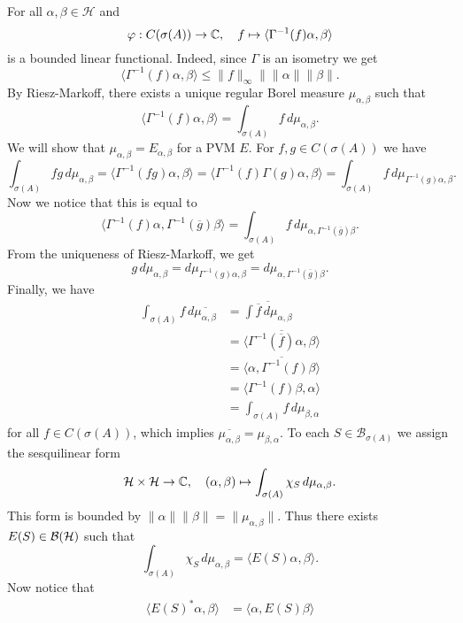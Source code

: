 \begin{myproof}
  For all $\alpha, \beta \in \mathcal{H}$ and 
  $$\varphi: C(\sigma(A)) \to \mathbb {C},\quad f \mapsto \langle \Gamma^{-1} (f) \alpha, \beta\rangle$$
  is a bounded linear functional. Indeed, since $\Gamma$ is an isometry we get
  $$\langle \Gamma^{-1} (f) \alpha, \beta\rangle \leq \| f\|_{\infty} \|  \|\alpha\| \| \beta\|.$$
  By Riesz-Markoff, there exists a unique regular Borel measure $\mu_{\alpha, \beta}$ such that
  $$\langle \Gamma^{-1} (f) \alpha, \beta\rangle = \int_{\sigma(A)} f\, d\mu_{\alpha, \beta}.$$
  We will show that $\mu_{\alpha, \beta} = E_{\alpha, \beta}$ for a PVM $E$.
  For $f, g \in C(\sigma(A))$ we have 
  $$\int_{\sigma(A)} fg\, d\mu_{\alpha, \beta} = \langle \Gamma^{-1}(fg) \alpha, \beta\rangle = \langle \Gamma^{-1} (f) \Gamma(g) \alpha, \beta \rangle = \int_{\sigma(A)} f\, d\mu_{\Gamma^{-1} (g) \alpha, \beta}.$$
  Now we notice that this is equal to 
  $$\langle \Gamma^{-1} (f) \alpha, \Gamma^{-1} (\overline{g}) \beta \rangle = \int_{\sigma(A)} f\, d\mu_{\alpha, \Gamma^{-1} (\overline{g}) \beta}.$$
  From the uniqueness of Riesz-Markoff, we get 
  $$g\, d{\mu_{\alpha, \beta}} = d\mu_{\Gamma^{-1} (g) \alpha, \beta} = d\mu_{\alpha, \Gamma^{-1}(\overline{g})\beta}.$$
  Finally, we have
  \begin{align*}
    \int_{\sigma(A)} f \, d\overline{\mu_{\alpha, \beta}} &= \overline{\int \overline{f}\, d\mu_{\alpha, \beta}}\\
    &= \overline{\langle \Gamma^{-1} (\overline{f}) \alpha, \beta \rangle}\\
    &= \overline{\langle \alpha, \Gamma^{-1} (f) \beta \rangle}\\
    &= \langle \Gamma^{-1} (f) \beta, \alpha\rangle\\
    &= \int_{\sigma(A)} f\, d\mu_{\beta, \alpha}
  \end{align*}
  for all $f \in C(\sigma(A))$, which implies $\overline{\mu_{\alpha, \beta}} = \mu_{\beta, \alpha}$. 
  To each $S \in \mathcal{B}_{\sigma(A)}$ we assign the sesquilinear form 
  $$\mathcal{H} \times \mathcal{H} \to \mathbb {C},\quad (\alpha, \beta) \mapsto \int_{\sigma(A)} \chi_S \, d\mu_{\alpha, \beta}.$$
  This form is bounded by $\|\alpha\| \|\beta\| = \|\mu_{\alpha, \beta}\|$.
  Thus there exists $E(S) \in \operatorname{\mathcal{B} (\mathcal{H})}$ such that 
  $$\int_{\sigma(A)}\chi_S \, d\mu_{\alpha, \beta} = \langle E(S) \alpha, \beta\rangle.$$
  Now notice that 
  \begin{align*}
    \langle E(S)^* \alpha, \beta \rangle &= \langle \alpha, E(S) \beta\rangle\\

\end{align*}
\end{myproof}
